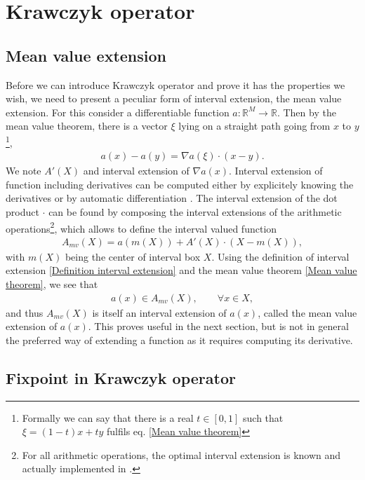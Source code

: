 \documentclass[
11pt, %
english, %
singlespacing, %
nolistspacing, %
liststotoc, %
headsepline, %
]{MastersDoctoralThesis} %
\begin{document}
\chapter{Krawczyk operator}
\label{Appendix: Krawczyk operator}

\section{Mean value extension}

Before we can introduce Krawczyk operator and prove it has the properties we wish, we need to present a peculiar form of interval extension, the mean value extension. For this consider a differentiable function $a : \mathbb{R}^M \rightarrow \mathbb{R}$. Then by the mean value theorem, there is a vector $\xi$ lying on a straight path going from $x$ to $y$\footnote{Formally we can say that there is a real $t \in [0, 1]$ such that $\xi = (1 - t)x + t y$ fulfils eq. \eqref{Mean value theorem}},
\begin{align}
	a(x) - a(y) = \nabla a(\xi) \cdot (x - y). \label{Mean value theorem}
\end{align}
We note $A'(X)$ and interval extension of $\nabla a(x)$. Interval extension of function including derivatives can be computed either by explicitely knowing the derivatives or by automatic differentiation \cite{fike2012automatic}. The interval extension of the dot product $\cdot$ can be found by composing the interval extensions of the arithmetic operations\footnote{For all arithmetic operations, the optimal interval extension is known and actually implemented in .}, which allows to define the interval valued function
\begin{align}
	A_{mv}(X) = a(m(X)) + A'(X) \cdot (X - m(X)), \label{Mean value extension}
\end{align}
with $m(X)$ being the center of interval box $X$. Using the definition of interval extension \eqref{Definition interval extension} and the mean value theorem \eqref{Mean value theorem}, we see that
\begin{align}
	a(x) \in A_{mv}(X), \qquad \forall x \in X,
\end{align}
and thus $A_{mv}(X)$ is itself an interval extension of $a(x)$, called the mean value extension of $a(x)$. This proves useful in the next section, but is not in general the preferred way of extending a function as it requires computing its derivative.

\section{Fixpoint in Krawczyk operator}
\end{document}
